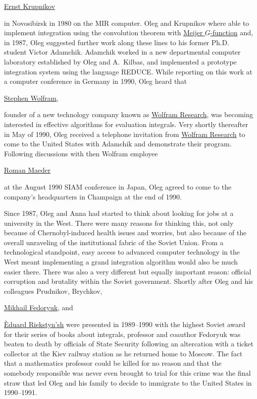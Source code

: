 \href{http://www.mathnet.ru/eng/person114502}{Ernst Krupnikov} 

in Novosibirsk in 1980 on the MIR computer. Oleg and Krupnikov where able to implement integration using the convolution theorem with \href{http://mathworld.wolfram.com/MeijerG-Function.html}{Meijer $G$-function} and, in 1987, Oleg suggested further work along these lines to his former Ph.D. student Victor Adamchik. Adamchik worked in a new departmental computer laboratory established by Oleg and A.~Kilbas, and implemented a prototype integration system using the language REDUCE. While reporting on this work at a computer conference in Germany in 1990, Oleg heard that

\href{http://www.stephenwolfram.com/}{Stephen Wolfram}, 

founder of a new technology company known as \href{http://www.wolfram.com/}{Wolfram Research}, was becoming interested in effective algorithms for evaluation integrals. Very shortly thereafter in May of 1990, Oleg received a telephone invitation from \href{http://www.wolfram.com/}{Wolfram Research} to come to the United States with Adamchik and demonstrate their program. Following discussions with then Wolfram employee 

\href{http://blog.wolfram.com/author/roman-maeder/}{Roman Maeder}

at the August 1990 SIAM conference in Japan, Oleg agreed to come to the company's headquarters in Champaign at the end of 1990.



Since 1987, Oleg and Anna had started to think about looking for jobs at a university in the West. There were many reasons for thinking this, not only because of Chernobyl-induced health issues and worries, but also because of the overall unraveling of the institutional fabric of the Soviet Union. From a technological standpoint, easy access to advanced computer technology in the West meant implementing a grand integration algorithm would also be much easier there. There was also a very different but equally important reason: official corruption and brutality within the Soviet government. Shortly after Oleg and his colleagues Prudnikov, Brychkov, 

\href{www.goodreads.com/author/show/6143782.Mikhail_V_Fedoryuk}{Mikhail Fedoryuk}, and 

\href{http://www.worldcat.org/identities/lccn-n88-9291/}{\`Eduard Riekstyn'sh} were presented in 1989–1990 with the highest Soviet award for their series of books about integrals, professor and coauthor Fedoryuk was beaten to death by officials of State Security following an altercation with a ticket collector at the Kiev railway station as he returned home to Moscow. The fact that a mathematics professor could be killed for no reason and that the somebody responsible was never even brought to trial for this crime was the final straw that led Oleg and his family to decide to immigrate to the United States in 1990–1991.





